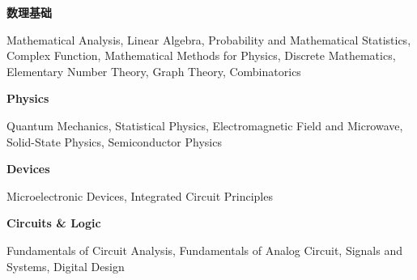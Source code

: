 
\newcommand{\levelentry}[1]{\item \textbf{#1}}
\newenvironment{cvcourses}
{
    \begin{cvlist}\item
    \small
}
{
    \normalsize
    \end{cvlist}
}

\begin{cvlist}
    \levelentry{数理基础}
    \begin{cvcourses}
        Mathematical Analysis, Linear Algebra, Probability and Mathematical Statistics,
        Complex Function, Mathematical Methods for Physics,
        Discrete Mathematics, Elementary Number Theory, Graph Theory, Combinatorics
    \end{cvcourses}

    \levelentry{Physics}
    \begin{cvcourses}
        Quantum Mechanics, Statistical Physics, Electromagnetic Field and Microwave,
        Solid-State Physics, Semiconductor Physics
    \end{cvcourses}
    
    \levelentry{Devices}
    \begin{cvcourses}
        Microelectronic Devices, Integrated Circuit Principles
    \end{cvcourses}



    \levelentry{Circuits \& Logic}
    \begin{cvcourses}
        Fundamentals of Circuit Analysis, Fundamentals of Analog Circuit, Signals and Systems, Digital Design
    \end{cvcourses}


\end{cvlist}
